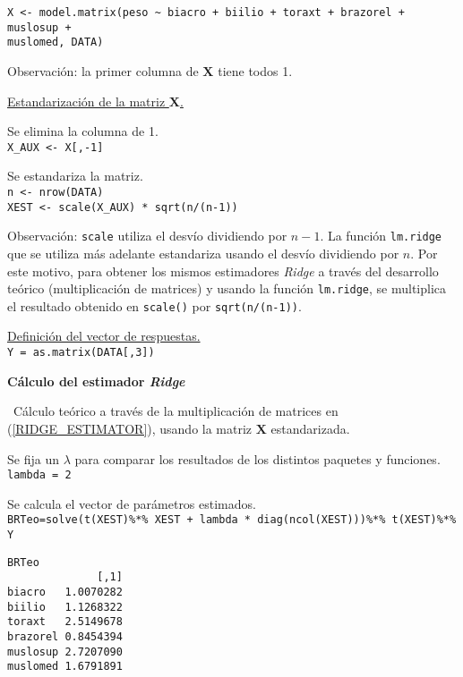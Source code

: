 \documentclass[a4paper,12pt]{report}
\begin{document}
{
\begin{verbatim}
X <- model.matrix(peso ~ biacro + biilio + toraxt + brazorel + muslosup + 
muslomed, DATA)
\end{verbatim}
}

Observación: la primer columna de $\boldsymbol{X}$ tiene todos 1.

\underline{Estandarización de la matriz $\boldsymbol{X}$.}

Se elimina la columna de 1.\\
\texttt{X\_AUX <- X[,-1]}

Se estandariza la matriz. \\
\texttt{n <- nrow(DATA)}\\
\texttt{XEST <- scale(X\_AUX) * sqrt(n/(n-1))}

Observación: \texttt{scale} utiliza el desvío dividiendo por $n-1$. La función \texttt{lm.ridge} que se utiliza más adelante estandariza usando el desvío dividiendo por $n$. Por este motivo, para obtener los mismos estimadores \textit{Ridge} a través del desarrollo teórico (multiplicación de matrices) y usando la función \texttt{lm.ridge}, se multiplica el resultado obtenido en \texttt{scale()} por \texttt{sqrt(n/(n-1))}.

\underline{Definición del vector de respuestas.}\\
\texttt{Y = as.matrix(DATA[,3])}

\vspace{1cm}

{\large\textbf{Cálculo del estimador \textit{Ridge}}}


\textbullet\ Cálculo teórico a través de la multiplicación de matrices en (\ref{RIDGE_ESTIMATOR}), usando la matriz $\boldsymbol{X}$ estandarizada.
\vspace{0.4cm}

Se fija un $\lambda$ para comparar los resultados de los distintos paquetes y funciones.\\
\texttt{lambda = 2}

Se calcula el vector de parámetros estimados.\\
\texttt{BRTeo=solve(t(XEST)\%*\% XEST + lambda * diag(ncol(XEST)))\%*\% t(XEST)\%*\% Y}

{
\begin{verbatim}
BRTeo
              [,1]
biacro   1.0070282
biilio   1.1268322
toraxt   2.5149678
brazorel 0.8454394
muslosup 2.7207090
muslomed 1.6791891
\end{verbatim}
}
\end{document}
